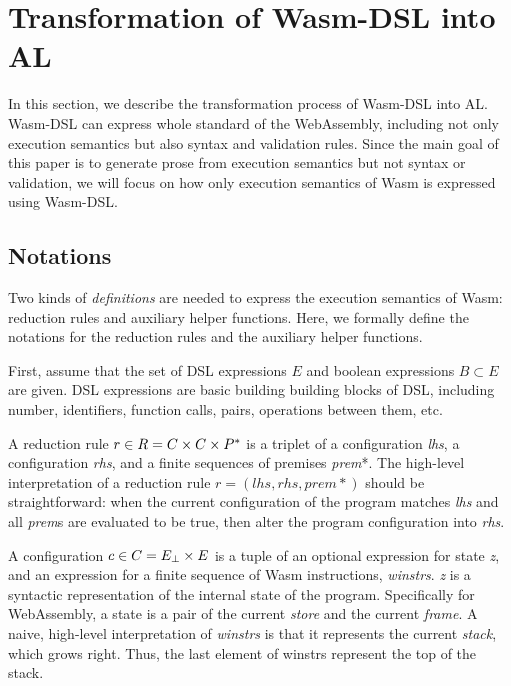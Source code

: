\section{Transformation of Wasm-DSL into AL}\label{sec:translate}

In this section, we describe the transformation process of Wasm-DSL into AL.
Wasm-DSL can express whole standard of the WebAssembly, including not only
execution semantics but also syntax and validation rules.
Since the main goal of this paper is to generate prose from execution semantics but not syntax or validation,
we will focus on how only execution semantics of Wasm is expressed using Wasm-DSL.

\subsection{Notations}

Two kinds of \textit{definitions} are needed to express the execution semantics of Wasm:
reduction rules and auxiliary helper functions.
Here, we formally define the notations for the reduction rules and the auxiliary helper functions.

First, assume that the set of DSL expressions $E$ and boolean expressions $B \subset E$ are given.
DSL expressions are basic building building blocks of DSL, including number, identifiers,
function calls, pairs, operations between them, etc. 

A reduction rule $r \in R = C \times C \times P^\ast$ is a triplet of a
configuration \textit{lhs}, a configuration \textit{rhs}, and a finite sequences of premises \textit{prem}*.
The high-level interpretation of a reduction rule $r = (lhs, rhs, prem*)$ should be straightforward:
when the current configuration of the program matches \textit{lhs} and all \textit{prem}s are
evaluated to be true, then alter the program configuration into \textit{rhs}.

A configuration $c \in C = E_\bot \times E$ is a tuple of an optional expression for state \textit{z},
and an expression for a finite sequence of Wasm instructions, \textit{winstrs}.
\textit{z} is a syntactic representation of the internal state of the program. Specifically for WebAssembly,
a state is a pair of the current \textit{store} and the current \textit{frame}. A naive, high-level
interpretation of \textit{winstrs} is that it represents the current \textit{stack}, which grows right.
Thus, the last element of winstrs represent the top of the stack.

